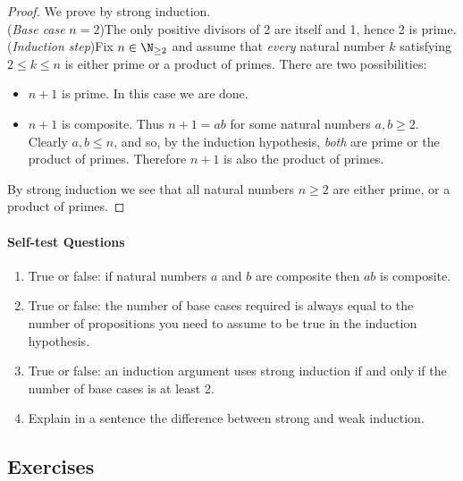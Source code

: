 \begin{proof}
We prove by strong induction.\\[2pt]
(\emph{Base case} $n=2$)\quad The only positive divisors of 2 are itself and 1, hence 2 is prime.\\[2pt]
(\emph{Induction step})\quad Fix $n\in\N_{\ge 2}$ and assume that \emph{every} natural number $k$ satisfying $2\le k\le n$ is either prime or a product of primes. There are two possibilities:
\begin{itemize}\setlength{\itemsep}{0pt}
  \item $n+1$ is prime. In this case we are done.
  \item $n+1$ is composite. Thus $n+1=ab$ for some natural numbers $a,b\ge 2$. Clearly $a,b\le n$, and so, by the induction hypothesis, \emph{both} are prime or the product of primes. Therefore $n+1$ is also the product of primes.
\end{itemize}
By strong induction we see that all natural numbers $n\ge 2$ are either prime, or a product of primes.
\end{proof}

\paragraph{Self-test Questions}

	\begin{enumerate}
    \item True or false: if natural numbers $a$ and $b$ are composite then $ab$ is composite.
    \item True or false: the number of base cases required is always equal to the number of propositions you need to assume to be true in the induction hypothesis.
    \item True or false: an induction argument uses strong induction if and only if the number of base cases is at least 2.
    \item Explain in a sentence the difference between strong and weak induction.
  \end{enumerate}

\subsection*{Exercises}

